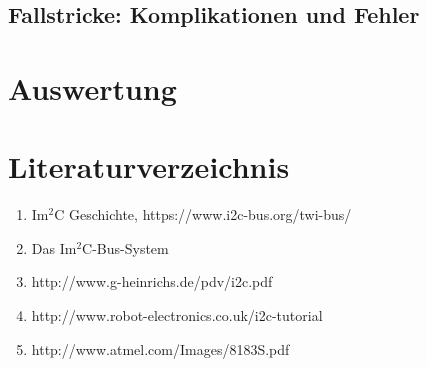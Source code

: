 \documentclass[12pt,a4paper]{report}
\begin{document}
\section{Fallstricke: Komplikationen und Fehler}


\chapter{Auswertung}


\chapter{Literaturverzeichnis}

\begin{enumerate}
	\item Im$^2$C Geschichte,  https://www.i2c-bus.org/twi-bus/
	\item Das Im$^2$C-Bus-System
	\item http://www.g-heinrichs.de/pdv/i2c.pdf
	\item http://www.robot-electronics.co.uk/i2c-tutorial
	\item http://www.atmel.com/Images/8183S.pdf
\end{enumerate}
\end{document}

